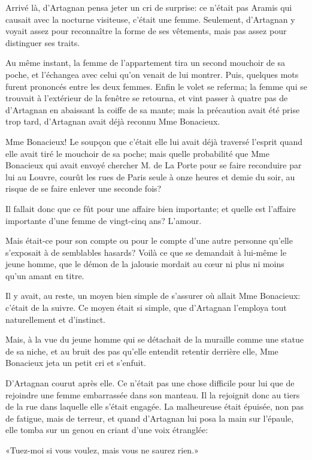 Arrivé là, d'Artagnan pensa jeter un cri de surprise: ce n'était pas Aramis qui causait avec la nocturne visiteuse, c'était une femme. Seulement, d'Artagnan y voyait assez pour reconnaître la forme de ses vêtements, mais pas assez pour distinguer ses traits. 

Au même instant, la femme de l'appartement tira un second mouchoir de sa poche, et l'échangea avec celui qu'on venait de lui montrer. Puis, quelques mots furent prononcés entre les deux femmes. Enfin le volet se referma; la femme qui se trouvait à l'extérieur de la fenêtre se retourna, et vint passer à quatre pas de d'Artagnan en abaissant la coiffe de sa mante; mais la précaution avait été prise trop tard, d'Artagnan avait déjà reconnu Mme Bonacieux. 

Mme Bonacieux! Le soupçon que c'était elle lui avait déjà traversé l'esprit quand elle avait tiré le mouchoir de sa poche; mais quelle probabilité que Mme Bonacieux qui avait envoyé chercher M. de La Porte pour se faire reconduire par lui au Louvre, courût les rues de Paris seule à onze heures et demie du soir, au risque de se faire enlever une seconde fois? 

Il fallait donc que ce fût pour une affaire bien importante; et quelle est l'affaire importante d'une femme de vingt-cinq ans? L'amour. 

Mais était-ce pour son compte ou pour le compte d'une autre personne qu'elle s'exposait à de semblables hasards? Voilà ce que se demandait à lui-même le jeune homme, que le démon de la jalousie mordait au cœur ni plus ni moins qu'un amant en titre. 

Il y avait, au reste, un moyen bien simple de s'assurer où allait Mme Bonacieux: c'était de la suivre. Ce moyen était si simple, que d'Artagnan l'employa tout naturellement et d'instinct. 

Mais, à la vue du jeune homme qui se détachait de la muraille comme une statue de sa niche, et au bruit des pas qu'elle entendit retentir derrière elle, Mme Bonacieux jeta un petit cri et s'enfuit. 

D'Artagnan courut après elle. Ce n'était pas une chose difficile pour lui que de rejoindre une femme embarrassée dans son manteau. Il la rejoignit donc au tiers de la rue dans laquelle elle s'était engagée. La malheureuse était épuisée, non pas de fatigue, mais de terreur, et quand d'Artagnan lui posa la main sur l'épaule, elle tomba sur un genou en criant d'une voix étranglée: 

«Tuez-moi si vous voulez, mais vous ne saurez rien.» 

